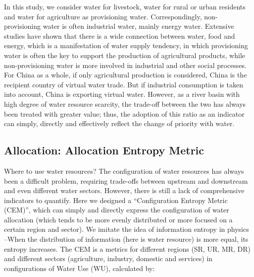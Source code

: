 \documentclass[9pt,twoside,lineno]{pnas-new}
\begin{document}
    In this study, we consider water for livestock, water for rural or urban residents and water for agriculture as provisioning water. Correspondingly, non-provisioning water is often industrial water, mainly energy water. Extensive studies have shown that there is a wide connection between water, food and energy, which is a manifestation of water supply tendency, in which provisioning water is often the key to support the production of agricultural products, while non-provisioning water is more involved in industrial and other social processes. For China as a whole, if only agricultural production is considered, China is the recipient country of virtual water trade. But if industrial consumption is taken into account, China is exporting virtual water. However, as a river basin with high degree of water resource scarcity, the trade-off between the two has always been treated with greater value; thus, the adoption of this ratio as an indicator can simply, directly and effectively reflect the change of priority with water.

\subsection*{Allocation: Allocation Entropy Metric}
    Where to use water resources? 
    The configuration of water resources has always been a difficult problem, requiring trade-offs between upstream and downstream and even different water sectors. However, there is still a lack of comprehensive indicators to quantify. 
    Here we designed a ``Configuration Entropy Metric (CEM)'', which can simply and directly express the configuration of water allocation (which tends to be more evenly distributed or more focused on a certain region and sector). 
    We imitate the idea of information entropy in physics --When the distribution of information (here is water resource) is more equal, its entropy increases.
    The CEM is a metrics for different regions (SR, UR, MR, DR) and different sectors (agriculture, industry, domestic and services) in configurations of Water Use (WU), calculated by:
\end{document}
